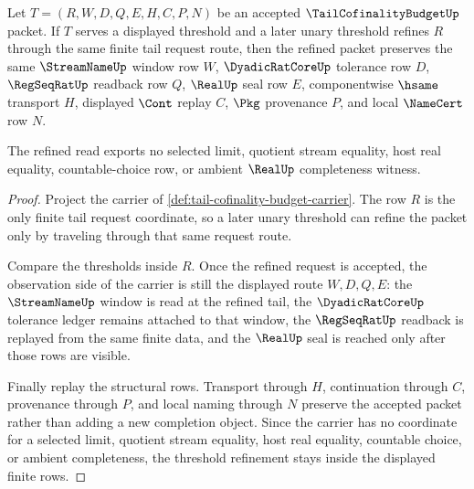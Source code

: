 \begin{theorem}
\label{thm:tail-cofinality-budget-threshold-monotonicity}
Let $T=(R,W,D,Q,E,H,C,P,N)$ be an accepted $\TailCofinalityBudgetUp$ packet. If $T$ serves a displayed threshold and a later unary threshold refines $R$ through the same finite tail request route, then the refined packet preserves the same $\StreamNameUp$ window row $W$, $\DyadicRatCoreUp$ tolerance row $D$, $\RegSeqRatUp$ readback row $Q$, $\RealUp$ seal row $E$, componentwise $\hsame$ transport $H$, displayed $\Cont$ replay $C$, $\Pkg$ provenance $P$, and local $\NameCert$ row $N$.

The refined read exports no selected limit, quotient stream equality, host real equality, countable-choice row, or ambient $\RealUp$ completeness witness.
\end{theorem}
\begin{proof}
Project the carrier of \autoref{def:tail-cofinality-budget-carrier}. The row $R$ is the only finite tail request coordinate, so a later unary threshold can refine the packet only by traveling through that same request route.

Compare the thresholds inside $R$. Once the refined request is accepted, the observation side of the carrier is still the displayed route $W,D,Q,E$: the $\StreamNameUp$ window is read at the refined tail, the $\DyadicRatCoreUp$ tolerance ledger remains attached to that window, the $\RegSeqRatUp$ readback is replayed from the same finite data, and the $\RealUp$ seal is reached only after those rows are visible.

Finally replay the structural rows. Transport through $H$, continuation through $C$, provenance through $P$, and local naming through $N$ preserve the accepted packet rather than adding a new completion object. Since the carrier has no coordinate for a selected limit, quotient stream equality, host real equality, countable choice, or ambient completeness, the threshold refinement stays inside the displayed finite rows.
\end{proof}

